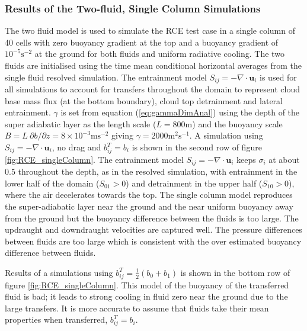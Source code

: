 \documentclass[draft]{agujournal2019}
\begin{document}
\subsubsection{Results of the Two-fluid, Single Column Simulations}

The two fluid model is used to simulate the RCE test case in a single
column of 40 cells with zero buoyancy gradient at the top and a buoyancy
gradient of $10^{-5}\text{s}^{-2}$ at the ground for both fluids
and uniform radiative cooling. The two fluids are initialised using
the time mean conditional horizontal averages from the single fluid
resolved simulation. The entrainment model $S_{ij}=-\nabla\cdot\mathbf{u}_{i}$
is used for all simulations to account for transfers throughout the
domain to represent cloud base mass flux (at the bottom boundary),
cloud top detrainment and lateral entrainment. $\gamma$ is set from
equation (\ref{eq:gammaDimAnal}) using the depth of the super adiabatic
layer as the length scale ($L=800\text{m}$) and the buoyancy scale
$B=L\ \partial b/\partial z=8\times10^{-3}\text{m}\text{s}^{-2}$
giving $\gamma=2000\text{m}^{2}\text{s}^{-1}$. A simulation using
$S_{ij}=-\nabla\cdot\mathbf{u}_{i}$, no drag and $b_{ij}^{T}=b_{i}$
is shown in the second row of figure \ref{fig:RCE_singleColumn}.
The entrainment model $S_{ij}=-\nabla\cdot\mathbf{u}_{i}$ keeps $\sigma_{i}$
at about 0.5 throughout the depth, as in the resolved simulation,
with entrainment in the lower half of the domain ($S_{01}>0$) and
detrainment in the upper half ($S_{10}>0$), where the air decelerates
towards the top. The single column model reproduces the super-adiabatic
layer near the ground and the near uniform buoyancy away from the
ground but the buoyancy difference between the fluids is too large.
The updraught and downdraught velocities are captured well. The pressure
differences between fluids are too large which is consistent with
the over estimated buoyancy difference between fluids. 

Results of a simulations using $b_{ij}^{T}=\frac{1}{2}(b_{0}+b_{1})$
is shown in the bottom row of figure \ref{fig:RCE_singleColumn}.
This model of the buoyancy of the transferred fluid is bad; it leads
to strong cooling in fluid zero near the ground due to the large transfers.
It is more accurate to assume that fluids take their mean properties
when transferred, $b_{ij}^{T}=b_{i}$. 
\end{document}
